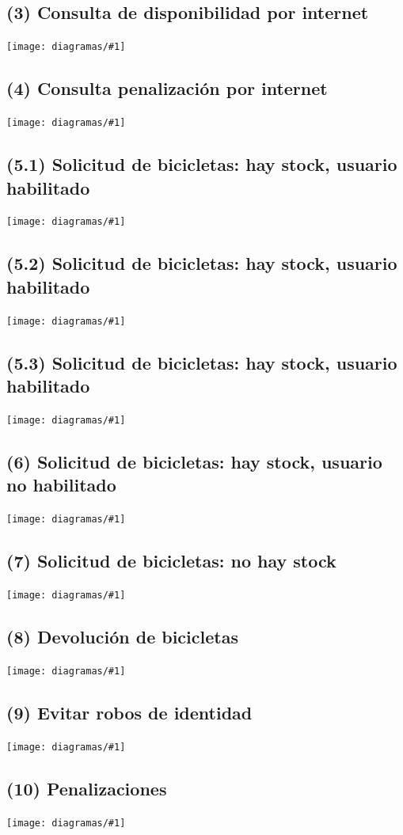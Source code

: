 \documentclass[a4paper, 10pt, twoside]{article}
\newcommand{\diagramav}[1]{
  \texttt{[image: diagramas/\#1]}
}
\newcommand{\diagramah}[1]{
  \texttt{[image: diagramas/\#1]}
}
\begin{document}
\subsection{(3)    Consulta de disponibilidad por internet}
\diagramah{objetivos-3}

\subsection{(4)    Consulta penalización por internet}
\diagramah{objetivos-4}

\subsection{(5.1)  Solicitud de bicicletas: hay stock, usuario habilitado}
\diagramah{objetivos-5.1}

\subsection{(5.2)  Solicitud de bicicletas: hay stock, usuario habilitado}
\diagramah{objetivos-5.2}

\subsection{(5.3)  Solicitud de bicicletas: hay stock, usuario habilitado}
\diagramah{objetivos-5.3}

\subsection{(6)    Solicitud de bicicletas: hay stock, usuario no habilitado}
\diagramav{objetivos-6}

\subsection{(7)    Solicitud de bicicletas: no hay stock}
\diagramav{objetivos-7}

\subsection{(8)    Devolución de bicicletas}
\diagramah{objetivos-8}

\subsection{(9)    Evitar robos de identidad}
\diagramav{objetivos-9}

\subsection{(10)   Penalizaciones}
\diagramah{objetivos-10}
\end{document}
